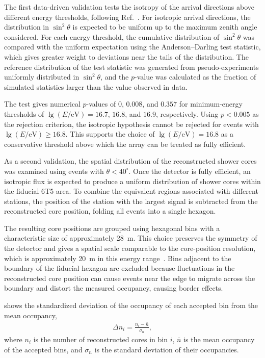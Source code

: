 \documentclass[main.tex]{subfiles}
\begin{document}
The first data-driven validation tests the isotropy of the arrival directions above different energy thresholds, following Ref.~\cite{GAP:Rodriguez:2024:Efficiency}.
For isotropic arrival directions, the distribution in $\sin^2\theta$ is expected to be uniform up to the maximum zenith angle considered.
For each energy threshold, the cumulative distribution of $\sin^2\theta$ was compared with the uniform expectation using the Anderson--Darling test statistic, which gives greater weight to deviations near the tails of the distribution.
The reference distribution of the test statistic was generated from pseudo-experiments uniformly distributed in $\sin^2\theta$, and the $p$-value was calculated as the fraction of simulated statistics larger than the value observed in data.

The test gives numerical $p$-values of $0$, $0.008$, and $0.357$ for minimum-energy thresholds of $\lg(E/\mathrm{eV})=16.7$, $16.8$, and $16.9$, respectively.
Using $p<0.005$ as the rejection criterion, the isotropic hypothesis cannot be rejected for events with $\lg(E/\mathrm{eV})\geq16.8$.
This supports the choice of $\lg(E/\mathrm{eV})=16.8$ as a conservative threshold above which the array can be treated as fully efficient.

As a second validation, the spatial distribution of the reconstructed shower cores was examined using events with $\theta<40^\circ$.
Once the detector is fully efficient, an isotropic flux is expected to produce a uniform distribution of shower cores within the fiducial 6T5 area.
To combine the equivalent regions associated with different stations, the position of the station with the largest signal is subtracted from the reconstructed core position, folding all events into a single hexagon.

The resulting core positions are grouped using hexagonal bins with a characteristic size of approximately \SI{28}{\m}.
This choice preserves the symmetry of the detector and gives a spatial scale comparable to the core-position resolution, which is approximately \SI{20}{\m} in this energy range~\cite{GAP:Gonzalez:2020:Geometry}.
Bins adjacent to the boundary of the fiducial hexagon are excluded because fluctuations in the reconstructed core position can cause events near the edge to migrate across the boundary and distort the measured occupancy, causing border effects.

 shows the standardized deviation of the occupancy of each accepted bin from the mean occupancy,
\begin{align}
    \Delta n_i = \frac{n_i-\bar{n}}{\sigma_n},
\end{align}
where $n_i$ is the number of reconstructed cores in bin $i$, $\bar{n}$ is the mean occupancy of the accepted bins, and $\sigma_n$ is the standard deviation of their occupancies.
\end{document}

